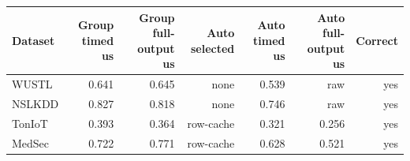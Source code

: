 \begin{tabular}{lrrrrrr}
\toprule
Dataset & Group timed us & Group full-output us & Auto selected & Auto timed us & Auto full-output us & Correct \\
\midrule
WUSTL & 0.641 & 0.645 & none & 0.539 & raw & yes \\
NSLKDD & 0.827 & 0.818 & none & 0.746 & raw & yes \\
TonIoT & 0.393 & 0.364 & row-cache & 0.321 & 0.256 & yes \\
MedSec & 0.722 & 0.771 & row-cache & 0.628 & 0.521 & yes \\
\bottomrule
\end{tabular}
